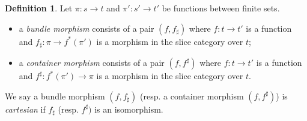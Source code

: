 \documentclass[11pt, article, one side]{memoir}
\theoremstyle{theorem}
\theoremstyle{definition}
\newtheorem{definition}[section]{Definition}
\theoremstyle{remark}
\newcommand{\Cat}[1]{\mathsf{#1}}%
\newcommand{\cont}{\Cat{Cont}}
\newcommand{\bun}{\Cat{Bun}}
\begin{document}
\begin{definition}\label{def.sheaves_bundles}
Let $\pi\colon s\to t$ and $\pi'\colon s'\to t'$ be functions between finite sets.
\begin{itemize}
	\item a \emph{bundle morphism} consists of a pair $(f,f_\sharp)$ where $f\colon t\to t'$ is a function and $f_\sharp\colon \pi\to f^*(\pi')$ is a morphism in the slice category over $t$;
	\item a \emph{container morphism} consists of a pair $(f,f^\sharp)$ where $f\colon t\to t'$ is a function and $f^\sharp\colon f^*(\pi')\to \pi$ is a morphism in the slice category over $t$.
\end{itemize}

We say a bundle morphism $(f, f_\sharp)$ (resp. a container morphism $(f, f^{\sharp})$) is \emph{cartesian} if $f_{\sharp}$ (resp. $f^{\sharp})$ is an isomorphism.


\end{definition}
\end{document}
